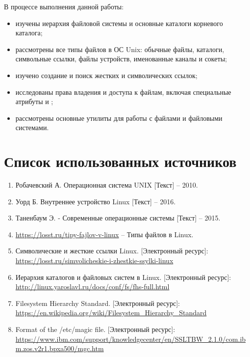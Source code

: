 В процессе выполнения данной работы:
\begin{itemize}
	\item изучены иерархия файловой системы и основные каталоги корневого каталога;
	\item рассмотрены все типы файлов в ОС Unix: обычные файлы, каталоги, символьные ссылки, файлы устройств, именованные каналы и сокеты;
	\item изучено создание и поиск жестких и символических ссылок;
	\item исследованы права владения и доступа к файлам, включая специальные атрибуты  и ;
	\item рассмотрены основные утилиты для работы с файлами и файловыми системами.
\end{itemize}

\section*{Список использованных источников}

\begin{enumerate}
	\item Робачевский А. Операционная система UNIX [Текст] -- 2010.
	\item Уорд Б. Внутреннее устройство Linux [Текст] -- 2016.
	\item Таненбаум Э. - Современные операционные системы [Текст] -- 2015.
	\item \url{https://losst.ru/tipy-fajlov-v-linux} -- Типы файлов в Linux.
	\item Символические и жесткие ссылки Linux. [Электронный ресурс]:\\
		\url{https://losst.ru/simvolicheskie-i-zhestkie-ssylki-linux}
	\item Иерархия каталогов и файловых систем в Linux. [Электронный ресурс]:\\
		\url{http://linux.yaroslavl.ru/docs/conf/fs/fhs-full.html}
	\item Filesystem Hierarchy Standard. [Электронный ресурс]:\\
		\url{https://en.wikipedia.org/wiki/Filesystem_Hierarchy_Standard}
	\item Format of the /etc/magic file. [Электронный ресурс]:\\
		\url{https://www.ibm.com/support/knowledgecenter/en/SSLTBW_2.1.0/com.ibm.zos.v2r1.bpxa500/mgc.htm}
\end{enumerate}


